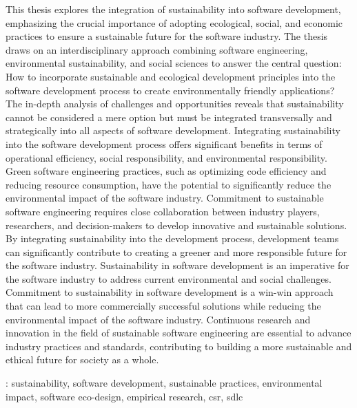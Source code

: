 \begin{secondlangabstract}

This thesis explores the integration of sustainability into software development, emphasizing the crucial importance of adopting ecological, social, and economic practices to ensure a sustainable future for the software industry.
The thesis draws on an interdisciplinary approach combining software engineering, environmental sustainability, and social sciences to answer the central question: How to incorporate sustainable and ecological development principles into the software development process to create environmentally friendly applications?
The in-depth analysis of challenges and opportunities reveals that sustainability cannot be considered a mere option but must be integrated transversally and strategically into all aspects of software development. Integrating sustainability into the software development process offers significant benefits in terms of operational efficiency, social responsibility, and environmental responsibility.
Green software engineering practices, such as optimizing code efficiency and reducing resource consumption, have the potential to significantly reduce the environmental impact of the software industry.
Commitment to sustainable software engineering requires close collaboration between industry players, researchers, and decision-makers to develop innovative and sustainable solutions.
By integrating sustainability into the development process, development teams can significantly contribute to creating a greener and more responsible future for the software industry.
Sustainability in software development is an imperative for the software industry to address current environmental and social challenges.
Commitment to sustainability in software development is a win-win approach that can lead to more commercially successful solutions while reducing the environmental impact of the software industry.
Continuous research and innovation in the field of sustainable software engineering are essential to advance industry practices and standards, contributing to building a more sustainable and ethical future for society as a whole.



\vspace*{10mm} 
\noindent
\textbf{\keywordslabel}: sustainability, software development, sustainable practices, environmental impact, software eco-design, empirical research, csr, sdlc

\end{secondlangabstract}

